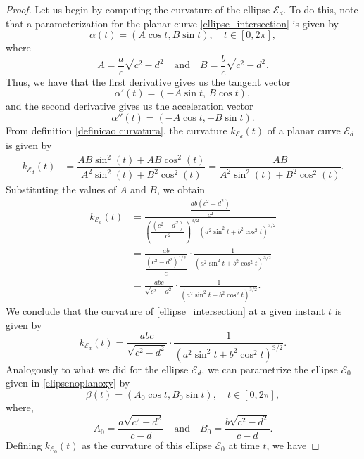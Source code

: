 \documentclass{amsart}
\theoremstyle{plain}
\numberwithin{equation}{section}
\begin{document}
\begin{proof}
	Let us begin by computing the curvature of the ellipse \( \mathcal{E}_d \). To do this, note that a parameterization for the planar curve  \eqref{ellipse_intersection} is given by
	\begin{equation}\label{parametriza elipse ed}
		\alpha(t) = (A \cos t, B \sin t), \quad t \in [0,2\pi],
	\end{equation}
	where
	$$
	A = \dfrac{a}{c}\sqrt{c^2 - d^2} \quad \text{and} \quad B = \dfrac{b}{c}\sqrt{c^2 - d^2}.
	$$
	Thus, we have that the first derivative gives us the tangent vector
	$$
	\alpha'(t) = (-A \sin t,\, B \cos t),
	$$
	and the second derivative gives us the acceleration vector
	$$
	\alpha''(t) = (-A \cos t, -B \sin t).
	$$
	From definition \ref{definicao curvatura}, the curvature $k_{\mathcal{E}_d}(t)$ of a planar curve $\mathcal{E}_d$ is given by
	\begin{align*}
		k_{\mathcal{E}_d}(t) & = \dfrac{AB \sin^2(t) + AB \cos^2(t)}{A^2 \sin^2(t) + B^2 \cos^2(t)}  = \dfrac{AB}{A^2 \sin^2(t) + B^2 \cos^2(t)}.
	\end{align*}
	Substituting the values of $A$ and $B$, we obtain
	\begin{align*}
		k_{\mathcal{E}_d}(t) &= \frac{\dfrac{ab(c^2 - d^2)}{c^2}}{\left( \dfrac{(c^2 - d^2)}{c^2} \right)^{3/2} (a^2 \sin^2 t + b^2 \cos^2 t)^{3/2}} \\
		&= \frac{ab}{\dfrac{(c^2 - d^2)^{1/2}}{c}} \cdot \frac{1}{(a^2 \sin^2 t + b^2 \cos^2 t)^{3/2}} \\
		&= \frac{abc}{\sqrt{c^2 - d^2}} \cdot \frac{1}{(a^2 \sin^2 t + b^2 \cos^2 t)^{3/2}}.
	\end{align*}
	We conclude that the curvature of \eqref{ellipse_intersection} at a given instant \( t \) is given by
	\begin{equation}\label{curvatura1}
		k_{\mathcal{E}_d}(t) = \frac{abc}{\sqrt{c^2 - d^2}} \cdot \frac{1}{(a^2 \sin^2 t + b^2 \cos^2 t)^{3/2}}.
	\end{equation}
	Analogously to what we did for the ellipse $\mathcal{E}_d$, we can parametrize the ellipse $\mathcal{E}_0$ given in \eqref{elipsenoplanoxy} by
	\begin{equation}\label{parametriza elipse e0}
		\beta(t) = (A_0 \cos t, B_0 \sin t), \quad t \in [0,2\pi],
	\end{equation}
	where,
	$$
	A_0 = \dfrac{a \sqrt{c^2 - d^2}}{c - d} \quad \text{and} \quad B_0 = \dfrac{b \sqrt{c^2 - d^2}}{c - d}.
	$$
	Defining $k_{\mathcal{E}_0}(t)$ as the curvature of this ellipse $\mathcal{E}_0$ at time $t$, we have

\end{proof}
\end{document}
